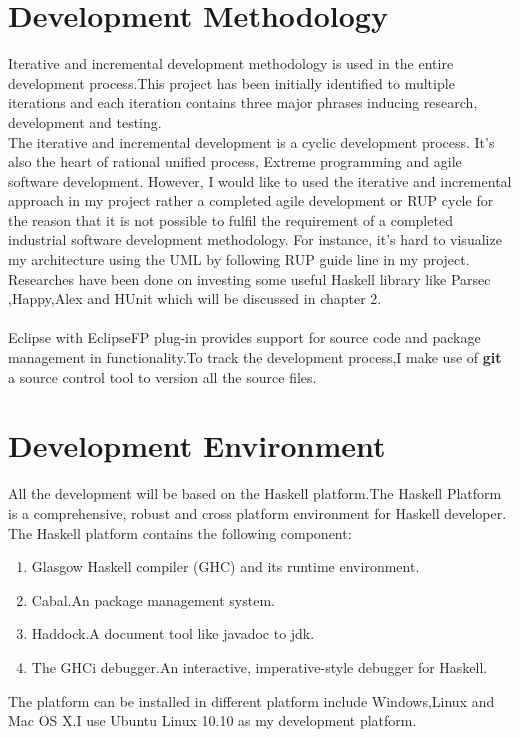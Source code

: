 \section{Development Methodology}
Iterative and incremental development methodology is used in the entire development process.This project has been initially identified to multiple iterations and each iteration contains three major phrases inducing research, development and testing.\\

The iterative and incremental development is a cyclic development process.
It’s also the heart of rational unified process, Extreme programming and
agile software development. However, I would like to used the iterative and
incremental approach in my project rather a completed agile development or
RUP cycle for the reason that it is not possible to fulfil the requirement of a
completed industrial software development methodology. For instance, it’s
hard to visualize my architecture using the UML by following RUP guide
line in my project.\\


Researches have been done on investing some useful Haskell library like Parsec ,Happy,Alex and HUnit which will be discussed in chapter 2.
\\
\\
Eclipse with EclipseFP plug-in provides support for source code and package management in functionality.To track the development process,I make use of \textbf{git} a source control tool to version all the source files.

\section{Development Environment}
All the development  will be based on the Haskell platform.The Haskell Platform is a comprehensive, robust and cross platform  environment for Haskell developer.
The Haskell platform contains the following component:
\begin{enumerate}
\item Glasgow Haskell compiler (GHC) and its runtime environment.
\item Cabal.An package management system.
\item Haddock.A document tool like javadoc to jdk.
\item The GHCi debugger.An interactive, imperative-style debugger for Haskell.
\end{enumerate}
The platform can be installed in different platform include Windows,Linux and Mac OS X.I use Ubuntu Linux 10.10 as my development platform.

